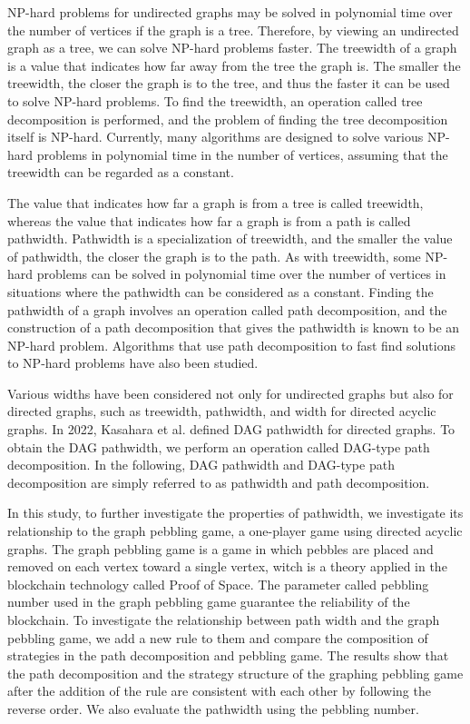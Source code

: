 \documentclass{kuisthesis}           %
\begin{document}
\begin{eabstract}				%

NP-hard problems for undirected graphs may be solved in polynomial time over the number of vertices if the graph is a tree. Therefore, by viewing an undirected graph as a tree, we can solve NP-hard problems faster. The treewidth of a graph is a value that indicates how far away from the tree the graph is. The smaller the treewidth, the closer the graph is to the tree, and thus the faster it can be used to solve NP-hard problems. To find the treewidth, an operation called tree decomposition is performed, and the problem of finding the tree decomposition itself is NP-hard. Currently, many algorithms are designed to solve various NP-hard problems in polynomial time in the number of vertices, assuming that the treewidth can be regarded as a constant.


The value that indicates how far a graph is from a tree is called treewidth, whereas the value that indicates how far a graph is from a path is called pathwidth. Pathwidth is a specialization of treewidth, and the smaller the value of pathwidth, the closer the graph is to the path. As with treewidth, some NP-hard problems can be solved in polynomial time over the number of vertices in situations where the pathwidth can be considered as a constant. Finding the pathwidth of a graph involves an operation called path decomposition, and the construction of a path decomposition that gives the pathwidth is known to be an NP-hard problem. Algorithms that use path decomposition to fast find solutions to NP-hard problems have also been studied.


Various widths have been considered not only for undirected graphs but also for directed graphs, such as treewidth, pathwidth, and width for directed acyclic graphs. In 2022, Kasahara et al. defined DAG pathwidth for directed graphs. To obtain the DAG pathwidth, we perform an operation called DAG-type path decomposition. In the following, DAG pathwidth and DAG-type path decomposition are simply referred to as pathwidth and path decomposition.

In this study, to further investigate the properties of pathwidth, we investigate its relationship to the graph pebbling game, a one-player game using directed acyclic graphs. The graph pebbling game is a game in which pebbles are placed and removed on each vertex toward a single vertex, witch is a theory applied in the blockchain technology called Proof of Space. The parameter called pebbling number used in the graph pebbling game guarantee the reliability of the blockchain. To investigate the relationship between path width and the graph pebbling game, we add a new rule to them and compare the composition of strategies in the path decomposition and pebbling game. The results show that the path decomposition and the strategy structure of the graphing pebbling game after the addition of the rule are consistent with each other by following the reverse order. We also evaluate the pathwidth using the pebbling number.


\end{eabstract}
\end{document}
